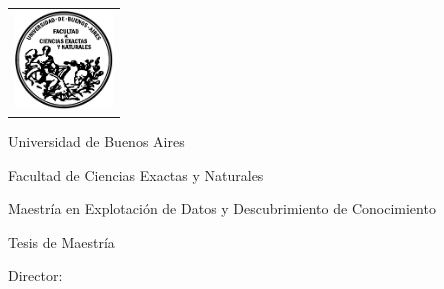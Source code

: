 \newcommand{\HRule}{\rule{\linewidth}{0.2mm}}
%
\thispagestyle{empty}

\begin{center}\leavevmode

\vspace{-2cm}

\begin{tabular}{l}
\includegraphics[width=2.6cm]{frontmatter/logofcen.pdf}
\end{tabular}


{\large \sc Universidad de Buenos Aires

Facultad de Ciencias Exactas y Naturales

Maestría en Explotación de Datos y Descubrimiento de Conocimiento}

\vspace{6.0cm}


\begin{huge}
\textbf{\tituloTesis}
\end{huge}

\vspace{2cm}

{\large Tesis de Maestría}

\vspace{2cm}

{\Large \autor}

\end{center}

\vfill

{\large

{Director: \director}

\vspace{.2cm}


\vspace{.2cm}

\lugar
\vspace{.2cm}

\fechapre

\vspace{.2cm}
\fechadef

\vspace{.2cm}
\firma
}

\newpage\thispagestyle{empty}
